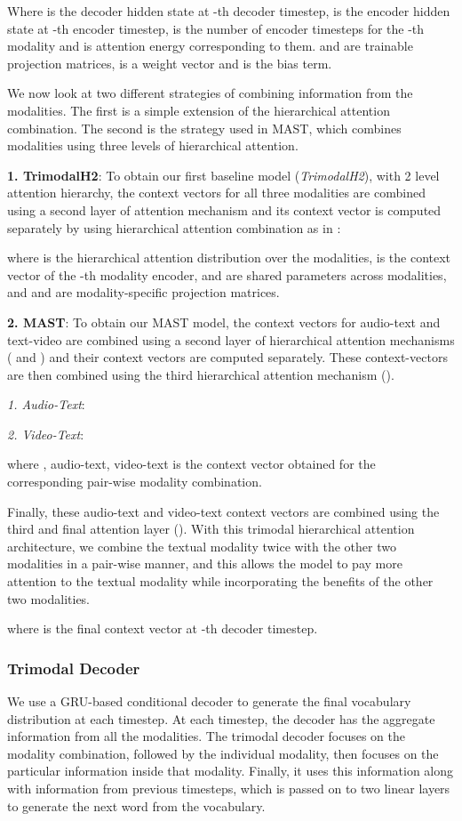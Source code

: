 \documentclass[11pt,a4paper]{article}
\begin{document}
Where  is the decoder hidden state at -th decoder timestep,  is the encoder hidden state at -th encoder timestep,  is the number of encoder timesteps for the -th modality and  is attention energy corresponding to them.  and  are trainable projection matrices,  is a weight vector and  is the bias term.

We now look at two different strategies of combining information from the modalities. The first is a simple extension of the hierarchical attention combination. The second is the strategy used in MAST, which combines modalities using three levels of hierarchical attention.

\textbf{1. TrimodalH2}:
To obtain our first baseline model (\emph{TrimodalH2}), with 2 level attention hierarchy, the context vectors for all three modalities are combined using a second layer of attention mechanism and its context vector is computed separately by using hierarchical attention combination as in \citet*{libovicky2017attention}:

where  is the hierarchical attention distribution over the modalities,  is the context vector of the -th modality encoder,  and  are shared parameters across modalities, and  and  are modality-specific projection matrices.

\textbf{2. MAST}:
To obtain our MAST model, the context vectors for audio-text and text-video are combined using a second layer of hierarchical attention mechanisms ( and ) and their context vectors are computed separately. These context-vectors are then combined using the third hierarchical attention mechanism ().

\emph{1. Audio-Text}:

\hspace{3mm} \emph{2. Video-Text}:

where , audio-text, video-text is the context vector obtained for the corresponding pair-wise modality combination.

Finally, these audio-text and video-text context vectors are combined using the third and final attention layer (). With this trimodal hierarchical attention architecture, we combine the textual modality twice with the other two modalities in a pair-wise manner, and this allows the model to pay more attention to the textual modality while incorporating the benefits of the other two modalities.

where  is the final context vector at -th decoder timestep.

\subsubsection{Trimodal Decoder}
We use a GRU-based conditional decoder \cite{firat2016git} to generate the final vocabulary distribution at each timestep. At each timestep, the decoder has the aggregate information from all the modalities. The trimodal decoder focuses on the modality combination, followed by the individual modality, then focuses on the particular information inside that modality. Finally, it uses this information along with information from previous timesteps, which is passed on to two linear layers to generate the next word from the vocabulary.
\end{document}
